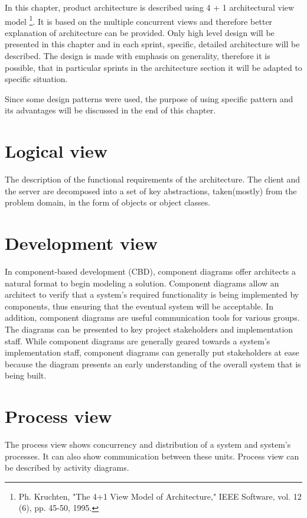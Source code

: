 In this chapter, product architecture is described using 4 + 1 architectural view model \footnote{Ph. Kruchten, "The 4+1 View Model of Architecture," IEEE Software, vol. 12 (6), pp. 45-50, 1995.}. It is based on the multiple concurrent views and therefore better explanation of architecture can be provided.
Only high level design will be presented in this chapter and in each sprint, specific, detailed architecture will be described.
The design is made with emphasis on generality, therefore it is possible, that in particular sprints in the architecture section it will be adapted to specific situation.

Since some design patterns were used, the purpose of using specific pattern and its advantages will be discussed in the end of this chapter.

\section{Logical view}
The description of the functional requirements of the architecture. The client and the server are decomposed into a set of key abstractions, taken(mostly) from the problem domain, in the form of objects or object classes.

\section{Development view}

In component-based development (CBD), component diagrams offer architects a natural format
to begin modeling a solution. Component diagrams allow an architect to verify that a system's
required functionality is being implemented by components, thus ensuring that the eventual system
will be acceptable.
In addition, component diagrams are useful communication tools for various groups. The diagrams
can be presented to key project stakeholders and implementation staff. While component diagrams
are generally geared towards a system's implementation staff, component diagrams can generally
put stakeholders at ease because the diagram presents an early understanding of the overall
system that is being built.

\section{Process view}
The process view shows concurrency and distribution of a system and system's processes.
It can also show communication between these units.
Process view can be described by activity diagrams.

